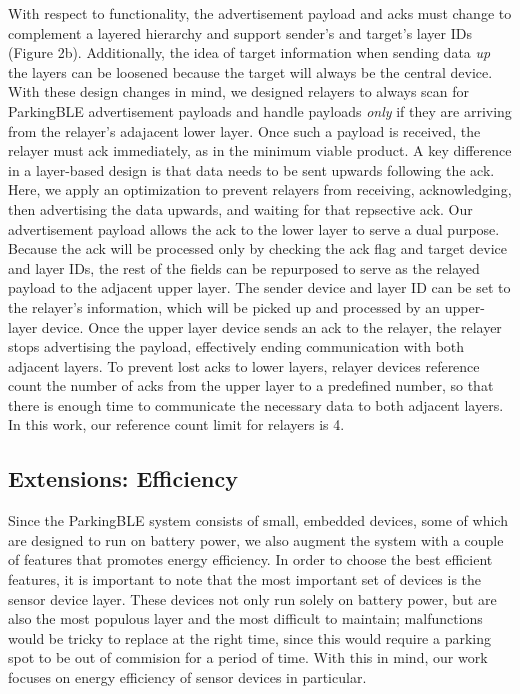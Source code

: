 \documentclass[sigconf]{acmart}
\begin{document}
With respect to functionality, the advertisement payload and acks must change
to complement a layered hierarchy and support sender's and target's layer IDs
(Figure 2b). Additionally, the idea of target information when sending data \textit{up} the
layers can be loosened because the target will always be the central device.
With these design changes in mind, we designed relayers to always scan for
ParkingBLE advertisement payloads and handle payloads \textit{only} if they
are arriving from the relayer's adajacent lower layer. Once such a payload is
received, the relayer must ack immediately, as in the minimum viable product.
A key difference in a layer-based design is that data needs to be sent upwards
following the ack. Here, we apply an optimization to prevent relayers from
receiving, acknowledging, then advertising the data upwards, and waiting for
that repsective ack. Our advertisement payload allows the ack to the lower
layer to serve a dual purpose. Because the ack will be processed only by checking
the ack flag and target device and layer IDs, the rest of the fields can be
repurposed to serve as the relayed payload to the adjacent upper layer. The
sender device and layer ID can be set to the relayer's information, which will
be picked up and processed by an upper-layer device. Once the upper layer device
sends an ack to the relayer, the relayer stops advertising the payload,
effectively ending communication with both adjacent layers. To prevent lost
acks to lower layers, relayer devices reference count the number of acks from
the upper layer to a predefined number, so that there is enough time to
communicate the necessary data to both adjacent layers. In this work, our
reference count limit for relayers is 4.

\subsection{Extensions: Efficiency}
Since the ParkingBLE system consists of small, embedded devices, some of which
are designed to run on battery power, we also augment the system with a couple
of features that promotes energy efficiency. In order to choose the best efficient
features, it is important to note that the most important set of devices is the
sensor device layer. These devices not only run solely on battery power, but are
also the most populous layer and the most difficult to maintain; malfunctions
would be tricky to replace at the right time, since this would require a parking
spot to be out of commision for a period of time. With this in mind, our work
focuses on energy efficiency of sensor devices in particular.\newline
\end{document}
